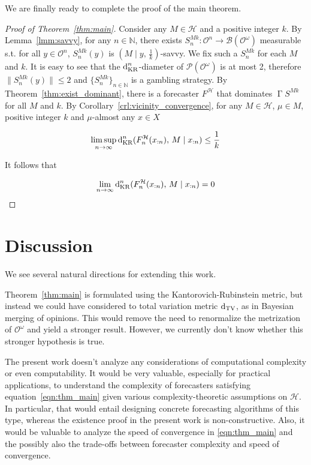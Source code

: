 \documentclass[11pt]{article}
\theoremstyle{definition}
\theoremstyle{plain}
\newcommand{\Nats}{\mathbb{N}}
\newcommand{\N}[1]{\lVert #1 \rVert}
\newcommand{\Sq}[2]{\{#1\}_{#2 \in \Nats}}
\newcommand{\Sqn}[1]{\Sq{#1}{n}}
\newcommand{\PM}{\mathcal{P}}
\newcommand{\DTV}{\operatorname{d}_{\textnormal{TV}}}
\newcommand{\DKR}{\operatorname{d}_{\textnormal{KR}}}
\newcommand{\Ob}{\mathcal{O}}
\newcommand{\OO}{\Ob^\omega}
\newcommand{\PMO}{\PM(\OO)}
\newcommand{\MC}{\mathcal{H}}
\newcommand{\Gm}{\mathcal{B}}
\newcommand{\GMO}{\Gm(\OO)}
\DeclareMathOperator{\PG}{\Gamma}
\begin{document}
We are finally ready to complete the proof of the main theorem.

\begin{proof}[Proof of Theorem~\ref{thm:main}]

Consider any $M \in \MC$ and a positive integer $k$. By Lemma~\ref{lmm:savvy}, for any $n \in \Nats$, there exists ${S^{Mk}_{n}: \Ob^n \rightarrow \GMO}$ measurable s.t. for all $y \in \Ob^n$, $S^{Mk}_{n}(y)$ is $(M \mid y,\,\frac{1}{k})$-savvy. We fix such a $S^{Mk}_{n}$ for each $M$ and $k$. It is easy to see that the $\DKR^n$-diameter of $\PMO$ is at most 2, therefore $\N{S^{Mk}_{n}(y)} \leq 2$ and $\Sqn{S^{Mk}_{n}}$ is a gambling strategy. By Theorem~\ref{thm:exist_dominant}, there is a forecaster $F^\MC$ that dominates $\PG{S}^{Mk}$ for all $M$ and $k$. By Corollary~\ref{crl:vicinity_convergence}, for any $M \in \MC$, $\mu \in M$, positive integer $k$ and $\mu$-almost any $x \in X$

$$\limsup_{n \rightarrow \infty} {\DKR^n(F^\MC_n(x_{:n}),\,M \mid x_{:n})} \leq \frac{1}{k}$$

It follows that

$$\lim_{n \rightarrow \infty} {\DKR^n(F^\MC_n(x_{:n}),\,M \mid x_{:n})} = 0$$
\end{proof}

\section{Discussion}

We see several natural directions for extending this work.

Theorem~\ref{thm:main} is formulated using the Kantorovich-Rubinstein metric, but instead we could have considered to total variation metric $\DTV$, as in Bayesian merging of opinions\cite{Blackwell_1962}. This would remove the need to renormalize the metrization of $\OO$ and yield a stronger result. However, we currently don't know whether this stronger hypothesis is true.

The present work doesn't analyze any considerations of computational complexity or even computability. It would be very valuable, especially for practical applications, to understand the complexity of forecasters satisfying equation~\ref{eqn:thm_main} given various complexity-theoretic assumptions on $\MC$. In particular, that would entail designing concrete forecasting algorithms of this type, whereas the existence proof in the present work is non-constructive. Also, it would be valuable to analyze the speed of convergence in \ref{eqn:thm_main} and the possibly also the trade-offs between forecaster complexity and speed of convergence.
\end{document}
